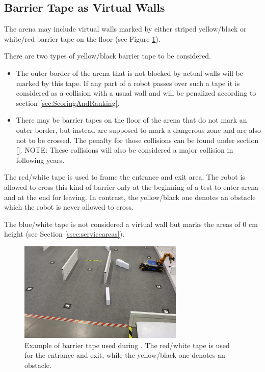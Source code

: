 \subsection{Barrier Tape as Virtual Walls} \label{ssec:barrier_tape}
The arena may include virtual walls marked by either striped yellow/black or white/red barrier tape on the floor (see Figure \ref{fig:barrier_tape}). 

There are two types of yellow/black barrier tape to be considered. 
\begin{itemize}
\item The outer border of the arena that is not blocked by actual walls will be marked by this tape. If any part of a robot passes over such a tape it is considered as a collision with a usual wall and will be penalized according to section \ref{sec:ScoringAndRanking}.
\item There may be barrier tapes on the floor of the arena that do not mark an outer border, but instead are supposed to mark a dangerous zone and are also not to be crossed. The penalty for those collisions can be found under section \ref{}. NOTE: These collisions will also be considered a major collision in following years.
\end{itemize}

The red/white tape is used to frame the entrance and exit area. The robot is allowed to cross this kind of barrier only at the beginning of a test to enter arena and at the end for leaving. In contrast, the yellow/black one denotes an obstacle which the robot is never allowed to cross.

The blue/white tape is not considered a virtual wall but marks the areas of 0 cm height (see Section \ref{ssec:serviceareas}).

\begin{figure} [h!]
\centering
\includegraphics[width= 0.7\textwidth ]{./images/barrier_tapes_in_china15.jpg}
\caption{Example of barrier tape used during . The red/white tape is used for the entrance and exit, while the yellow/black one denotes an obstacle.}
\label{fig:barrier_tape}
\end{figure}



